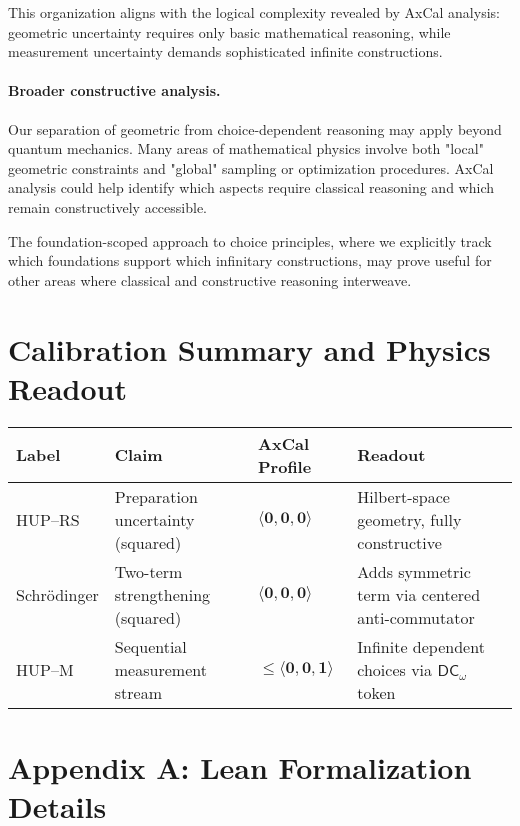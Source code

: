 \documentclass[11pt]{article}
\newcommand{\DCw}{\mathsf{DC}_{\omega}}
\newcommand{\hzero}{\mathbf{0}}
\newcommand{\hone}{\mathbf{1}}
\newcommand{\allzero}{\langle \hzero,\hzero,\hzero\rangle}
\newcommand{\DCwonly}{\langle \hzero,\hzero,\hone\rangle}
\theoremstyle{plain}
\theoremstyle{definition}
\theoremstyle{remark}
\begin{document}
This organization aligns with the logical complexity revealed by AxCal analysis: geometric uncertainty requires only basic mathematical reasoning, while measurement uncertainty demands sophisticated infinite constructions.

\paragraph{Broader constructive analysis.}
Our separation of geometric from choice-dependent reasoning may apply beyond quantum mechanics. Many areas of mathematical physics involve both "local" geometric constraints and "global" sampling or optimization procedures. AxCal analysis could help identify which aspects require classical reasoning and which remain constructively accessible.

The foundation-scoped approach to choice principles, where we explicitly track which foundations support which infinitary constructions, may prove useful for other areas where classical and constructive reasoning interweave.

\section{Calibration Summary and Physics Readout}

\begin{center}
\begin{tabular}{@{}llll@{}}
\toprule
\textbf{Label} & \textbf{Claim} & \textbf{AxCal Profile} & \textbf{Readout} \\
\midrule
HUP--RS & Preparation uncertainty (squared) & $\allzero$ &
Hilbert-space geometry, fully constructive \\
Schrödinger & Two-term strengthening (squared) & $\allzero$ &
Adds symmetric term via centered anti-commutator \\
HUP--M & Sequential measurement stream & $\le \DCwonly$ &
Infinite dependent choices via $\DCw$ token \\
\bottomrule
\end{tabular}
\end{center}

\section*{Appendix A: Lean Formalization Details}
\label{sec:engineering}
\end{document}
